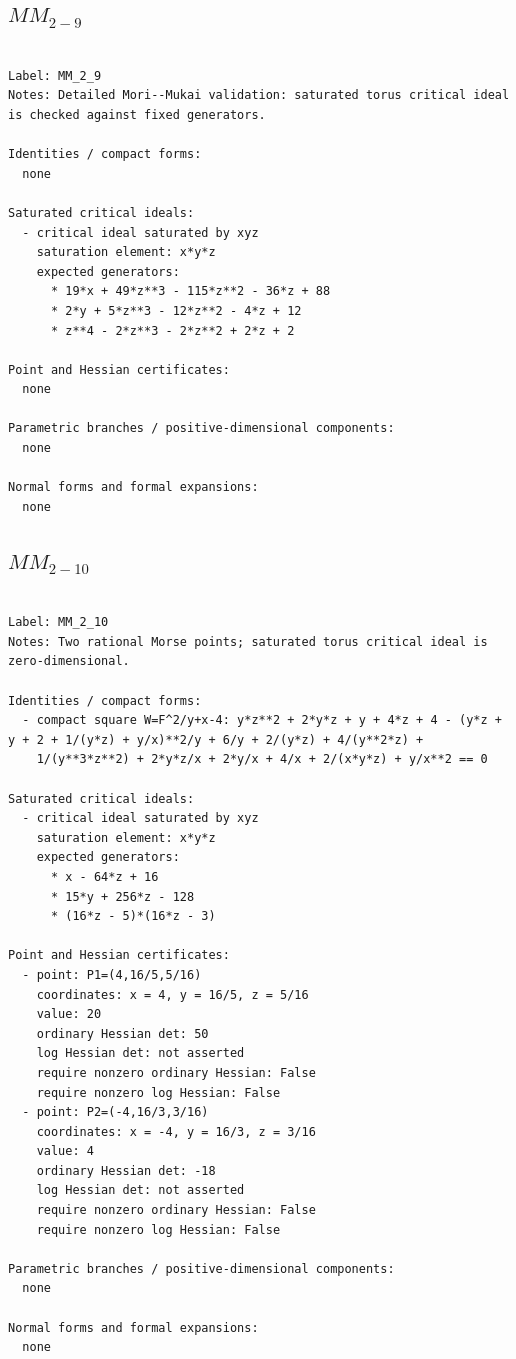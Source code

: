 \documentclass[10pt,a4paper]{article}
\begin{document}
\subsection*{$ MM_{2-9} $}

\begin{lstlisting}

Label: MM_2_9
Notes: Detailed Mori--Mukai validation: saturated torus critical ideal is checked against fixed generators.

Identities / compact forms:
  none

Saturated critical ideals:
  - critical ideal saturated by xyz
    saturation element: x*y*z
    expected generators:
      * 19*x + 49*z**3 - 115*z**2 - 36*z + 88
      * 2*y + 5*z**3 - 12*z**2 - 4*z + 12
      * z**4 - 2*z**3 - 2*z**2 + 2*z + 2

Point and Hessian certificates:
  none

Parametric branches / positive-dimensional components:
  none

Normal forms and formal expansions:
  none

\end{lstlisting}

\subsection*{$ MM_{2-10} $}

\begin{lstlisting}

Label: MM_2_10
Notes: Two rational Morse points; saturated torus critical ideal is zero-dimensional.

Identities / compact forms:
  - compact square W=F^2/y+x-4: y*z**2 + 2*y*z + y + 4*z + 4 - (y*z + y + 2 + 1/(y*z) + y/x)**2/y + 6/y + 2/(y*z) + 4/(y**2*z) +
    1/(y**3*z**2) + 2*y*z/x + 2*y/x + 4/x + 2/(x*y*z) + y/x**2 == 0

Saturated critical ideals:
  - critical ideal saturated by xyz
    saturation element: x*y*z
    expected generators:
      * x - 64*z + 16
      * 15*y + 256*z - 128
      * (16*z - 5)*(16*z - 3)

Point and Hessian certificates:
  - point: P1=(4,16/5,5/16)
    coordinates: x = 4, y = 16/5, z = 5/16
    value: 20
    ordinary Hessian det: 50
    log Hessian det: not asserted
    require nonzero ordinary Hessian: False
    require nonzero log Hessian: False
  - point: P2=(-4,16/3,3/16)
    coordinates: x = -4, y = 16/3, z = 3/16
    value: 4
    ordinary Hessian det: -18
    log Hessian det: not asserted
    require nonzero ordinary Hessian: False
    require nonzero log Hessian: False

Parametric branches / positive-dimensional components:
  none

Normal forms and formal expansions:
  none

\end{lstlisting}
\end{document}
